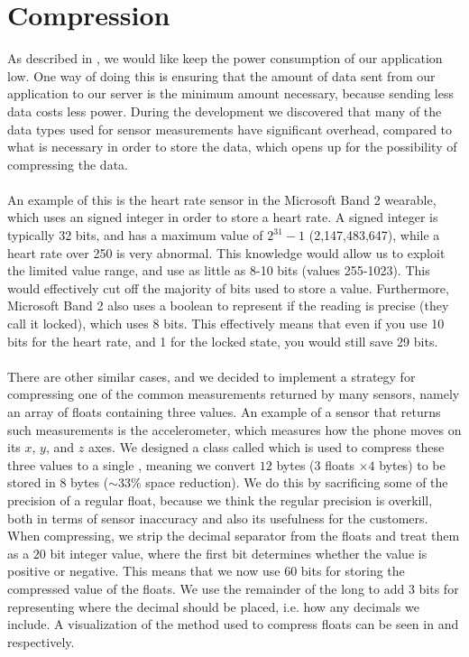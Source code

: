
\section{Compression}
\label{sec:compression}

As described in , we would like keep the power consumption of our application low. One way of doing this is ensuring that the amount of data sent from our application to our server is the minimum amount necessary, because sending less data costs less power. During the development we discovered that many of the data types used for sensor measurements have significant overhead, compared to what is necessary in order to store the data, which opens up for the possibility of compressing the data. 
\\\\
An example of this is the heart rate sensor in the Microsoft Band 2 wearable, which uses an signed integer in order to store a heart rate. A signed integer is typically 32 bits, and has a maximum value of $2^{31} - 1$ (2,147,483,647), while a heart rate over 250 is very abnormal. This knowledge would allow us to exploit the limited value range, and use as little as 8-10 bits (values 255-1023). This would effectively cut off the majority of bits used to store a value. Furthermore, Microsoft Band 2 also uses a boolean to represent if the reading is precise (they call it locked), which uses 8 bits. This effectively means that even if you use 10 bits for the heart rate, and 1 for the locked state, you would still save 29 bits.    
\\\\
There are other similar cases, and we decided to implement a strategy for compressing one of the common measurements returned by many sensors, namely an array of floats containing three values. An example of a sensor that returns such measurements is the accelerometer, which measures how the phone moves on its $x$, $y$, and $z$ axes. We designed a class called  which is used to compress these three values to a single , meaning we convert $12$ bytes ($3$ floats $\times 4$ bytes) to be stored in $8$ bytes ($\sim 33\%$ space reduction). We do this by sacrificing some of the precision of a regular float, because we think the regular precision is overkill, both in terms of sensor inaccuracy and also its usefulness for the customers. When compressing, we strip the decimal separator from the floats and treat them as a $20$ bit integer value, where the first bit determines whether the value is positive or negative. This means that we now use $60$ bits for storing the compressed value of the floats. We use the remainder of the long to add 3 bits for representing where the decimal should be placed, i.e. how any decimals we include. A visualization of the method used to compress floats can be seen in  and  respectively.

